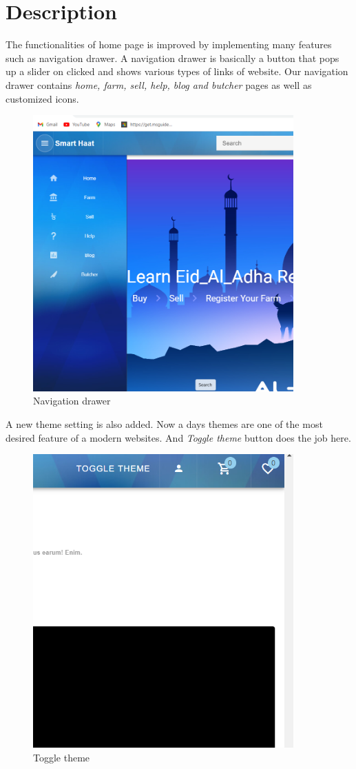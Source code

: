\documentclass[a4paper,12pt]{report}
\begin{document}
\section*{Description}
The functionalities of home page is improved by implementing many features such as navigation drawer. A navigation drawer is basically a button that pops up a slider on clicked and shows various types of links of website. Our navigation drawer contains \emph{home, farm, sell, help, blog and butcher} pages as well as customized icons.
\begin{figure}[H]
\centering
\includegraphics[keepaspectratio, width=10cm]{one.png}
\caption{Navigation drawer}
\label{drawer}
\end{figure}
A new theme setting is also added. Now a days themes are one of the most desired feature of a modern websites. And \emph{Toggle theme} button does the job here.
\begin{figure}[H]
\centering
\includegraphics[keepaspectratio, width=10cm]{two.png}
\caption{Toggle theme}
\label{theme}
\end{figure}
\end{document}
